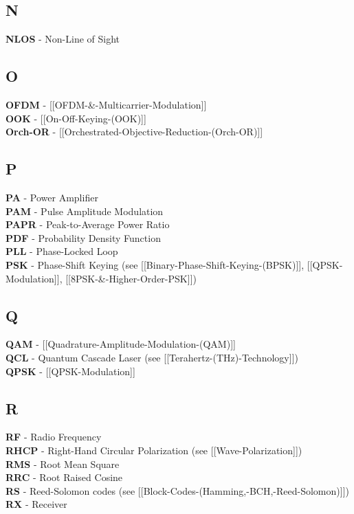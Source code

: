 \subsection{N}\label{sec:acronyms-n}

\textbf{NLOS} - Non-Line of Sight

\subsection{O}\label{sec:acronyms-o}

\textbf{OFDM} - {[}{[}OFDM-\&-Multicarrier-Modulation{]}{]}\\
\textbf{OOK} - {[}{[}On-Off-Keying-(OOK){]}{]}\\
\textbf{Orch-OR} -
{[}{[}Orchestrated-Objective-Reduction-(Orch-OR){]}{]}

\subsection{P}\label{sec:acronyms-p}

\textbf{PA} - Power Amplifier\\
\textbf{PAM} - Pulse Amplitude Modulation\\
\textbf{PAPR} - Peak-to-Average Power Ratio\\
\textbf{PDF} - Probability Density Function\\
\textbf{PLL} - Phase-Locked Loop\\
\textbf{PSK} - Phase-Shift Keying (see
{[}{[}Binary-Phase-Shift-Keying-(BPSK){]}{]},
{[}{[}QPSK-Modulation{]}{]}, {[}{[}8PSK-\&-Higher-Order-PSK{]}{]})

\subsection{Q}\label{sec:acronyms-q}

\textbf{QAM} - {[}{[}Quadrature-Amplitude-Modulation-(QAM){]}{]}\\
\textbf{QCL} - Quantum Cascade Laser (see
{[}{[}Terahertz-(THz)-Technology{]}{]})\\
\textbf{QPSK} - {[}{[}QPSK-Modulation{]}{]}

\subsection{R}\label{sec:acronyms-r}

\textbf{RF} - Radio Frequency\\
\textbf{RHCP} - Right-Hand Circular Polarization (see
{[}{[}Wave-Polarization{]}{]})\\
\textbf{RMS} - Root Mean Square\\
\textbf{RRC} - Root Raised Cosine\\
\textbf{RS} - Reed-Solomon codes (see
{[}{[}Block-Codes-(Hamming,-BCH,-Reed-Solomon){]}{]})\\
\textbf{RX} - Receiver

